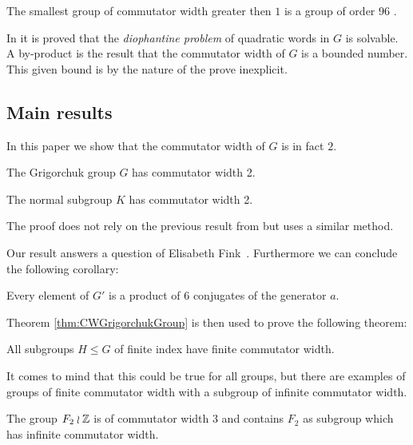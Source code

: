 \documentclass[a4paper,11pt]{amsart}
\begin{document}
The smallest group of commutator width greater then $1$ is a group of 
order $96$ \cite{Guralnick:Group96}.



In \cite{Lysenok:QudraticEquationsInGrig} it is proved that the \emph{diophantine problem}
of quadratic words in $G$ is solvable. A by-product is the result that the
commutator width of $G$ is a bounded number. This given bound is by the nature
of the prove inexplicit.

\subsection{Main results}
In this paper we show that the commutator width of $G$ is in fact $2$.
\begin{thma}\label{thm:CWGrigorchukGroup}
 The Grigorchuk group $G$ has commutator width 2.
 
 The normal subgroup $K$ has commutator width 2.
\end{thma}
The proof does not rely on the previous result from \cite{Lysenok:QudraticEquationsInGrig}
but uses a similar method.

Our result answers a question of Elisabeth Fink~\cite[Question 3]{Fink:Conjugacy_growth}.
Furthermore we can conclude the following corollary: 
\begin{cora}
 Every element of $G'$ is a product of 
$6$ conjugates of the generator $a$.
\end{cora}

Theorem \ref{thm:CWGrigorchukGroup} is then used to prove the following theorem:
\begin{thma}
 All subgroups $H\leq G$ of finite index have finite commutator width.
\end{thma}
It comes to mind that this could be true for all groups, but there
are examples of groups of finite commutator width with a subgroup of
infinite commutator width.
\begin{ex}
 The group $F_2\wr \mathbb{Z}$ is of commutator width $3$
 and contains $F_2$ as subgroup which has infinite commutator width.
\end{ex}
\end{document}
